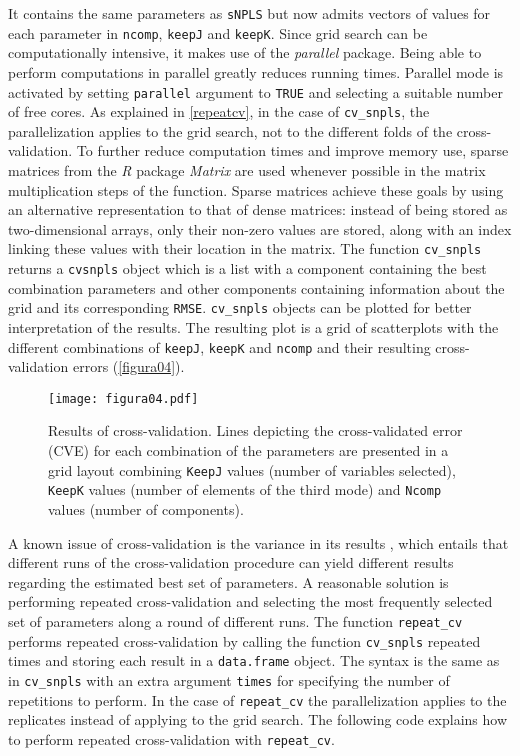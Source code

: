 It contains the same parameters as \texttt{sNPLS} but now admits vectors of values for each parameter in \texttt{ncomp}, \texttt{keepJ} and \texttt{keepK}. Since grid search can be computationally intensive, it makes use of the \textit{parallel} package. Being able to perform computations in parallel greatly reduces running times. Parallel mode is activated by setting \texttt{parallel} argument to \texttt{TRUE} and selecting a suitable number of free cores. As explained in \autoref{repeatcv}, in the case of \texttt{cv\_snpls}, the parallelization applies to the grid search, not to the different folds of the cross-validation. To further reduce computation times and improve memory use, sparse matrices from the \textit{R} package \textit{Matrix} \parencite{matrixsparse} are used whenever possible in the matrix multiplication steps of the function. Sparse matrices achieve these goals by using an alternative representation to that of dense matrices: instead of being stored as two-dimensional arrays, only their non-zero values are stored, along with an index linking these values with their location in the matrix. The function \texttt{cv\_snpls} returns a \texttt{cvsnpls} object which is a list with a component containing the best combination parameters and other components containing information about the grid and its corresponding \texttt{RMSE}. \texttt{cv\_snpls} objects  can be plotted for better interpretation of the results. The resulting plot is a grid of scatterplots with the different combinations of \texttt{keepJ}, \texttt{keepK} and \texttt{ncomp} and their resulting cross-validation errors (\autoref{figura04}).

\begin{figure}[!ht]
	\centering
\texttt{[image: figura04.pdf]}
\caption{Results of cross-validation. Lines depicting the cross-validated error (CVE) for each combination of the parameters are presented in a grid layout combining \texttt{KeepJ} values (number of variables selected), \texttt{KeepK} values (number of elements of the third mode) and \texttt{Ncomp} values (number of components).}
\label{figura04}
\end{figure}

A known issue of cross-validation is the variance in its results \parencite{krstajic2014cross}, which entails that different runs of the cross-validation procedure can yield different results regarding the estimated best set of parameters. A reasonable solution is performing repeated cross-validation and selecting the most frequently selected set of parameters along a round of different runs. The function \texttt{repeat\_cv} performs repeated cross-validation by calling the function \texttt{cv\_snpls} repeated times and storing each result in a \texttt{data.frame} object. The syntax is the same as in \texttt{cv\_snpls} with an extra argument \texttt{times} for specifying the number of repetitions to perform. In the case of \texttt{repeat\_cv} the parallelization applies to the replicates instead of applying to the grid search. The following code explains how to perform repeated cross-validation with \texttt{repeat\_cv}.

